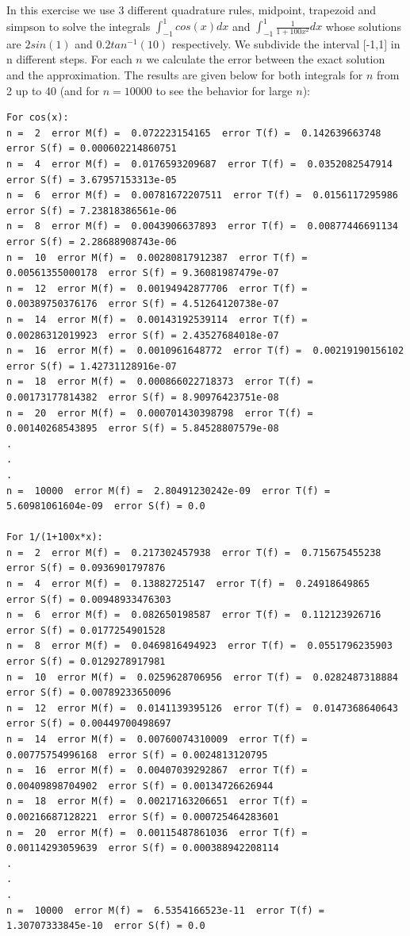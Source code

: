 \documentclass[10pt,a4paper]{article}
\begin{document}
\noindent In this exercise we use 3 different quadrature rules, midpoint, trapezoid and simpson to solve the integrals $\int_{-1}^{1} cos(x) dx$ and $\int_{-1}^{1} \frac{1}{1+100x^2} dx$ whose solutions are $2sin(1)$ and 
$0.2tan^{-1}(10)$ respectively. We subdivide the interval [-1,1] in n different steps. For each $n$ we calculate the error between the exact solution and the approximation. The results are given below for both integrals for $n$ from 2 up to 40 (and for $n = 10000$ to see the behavior for large $n$):

\begin{lstlisting}
For cos(x):
n =  2  error M(f) =  0.072223154165  error T(f) =  0.142639663748  error S(f) = 0.000602214860751
n =  4  error M(f) =  0.0176593209687  error T(f) =  0.0352082547914  error S(f) = 3.67957153313e-05
n =  6  error M(f) =  0.00781672207511  error T(f) =  0.0156117295986  error S(f) = 7.23818386561e-06
n =  8  error M(f) =  0.0043906637893  error T(f) =  0.00877446691134  error S(f) = 2.28688908743e-06
n =  10  error M(f) =  0.00280817912387  error T(f) =  0.00561355000178  error S(f) = 9.36081987479e-07
n =  12  error M(f) =  0.00194942877706  error T(f) =  0.00389750376176  error S(f) = 4.51264120738e-07
n =  14  error M(f) =  0.00143192539114  error T(f) =  0.00286312019923  error S(f) = 2.43527684018e-07
n =  16  error M(f) =  0.0010961648772  error T(f) =  0.00219190156102  error S(f) = 1.42731128916e-07
n =  18  error M(f) =  0.000866022718373  error T(f) =  0.00173177814382  error S(f) = 8.90976423751e-08
n =  20  error M(f) =  0.000701430398798  error T(f) =  0.00140268543895  error S(f) = 5.84528807579e-08
.
.
.
n =  10000  error M(f) =  2.80491230242e-09  error T(f) =  5.60981061604e-09  error S(f) = 0.0

For 1/(1+100x*x):
n =  2  error M(f) =  0.217302457938  error T(f) =  0.715675455238  error S(f) = 0.0936901797876
n =  4  error M(f) =  0.13882725147  error T(f) =  0.24918649865  error S(f) = 0.00948933476303
n =  6  error M(f) =  0.082650198587  error T(f) =  0.112123926716  error S(f) = 0.0177254901528
n =  8  error M(f) =  0.0469816494923  error T(f) =  0.0551796235903  error S(f) = 0.0129278917981
n =  10  error M(f) =  0.0259628706956  error T(f) =  0.0282487318884  error S(f) = 0.00789233650096
n =  12  error M(f) =  0.0141139395126  error T(f) =  0.0147368640643  error S(f) = 0.00449700498697
n =  14  error M(f) =  0.00760074310009  error T(f) =  0.00775754996168  error S(f) = 0.0024813120795
n =  16  error M(f) =  0.00407039292867  error T(f) =  0.00409898704902  error S(f) = 0.00134726626944
n =  18  error M(f) =  0.00217163206651  error T(f) =  0.00216687128221  error S(f) = 0.000725464283601
n =  20  error M(f) =  0.00115487861036  error T(f) =  0.00114293059639  error S(f) = 0.000388942208114
.
.
.
n =  10000  error M(f) =  6.5354166523e-11  error T(f) =  1.30707333845e-10  error S(f) = 0.0
\end{lstlisting}
\end{document}

